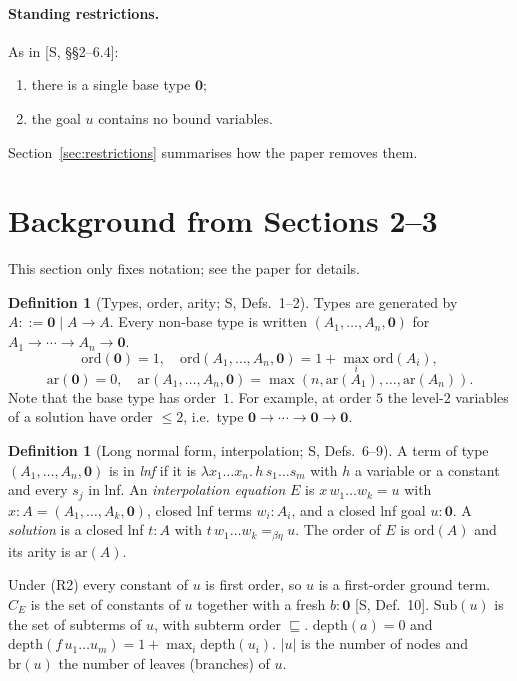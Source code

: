 \documentclass[11pt]{article}
\newcommand{\Ground}{\mathbf{0}}
\newcommand{\ord}{\mathrm{ord}}
\newcommand{\ar}{\mathrm{ar}}
\newcommand{\Sub}{\mathrm{Sub}}
\newcommand{\depth}{\mathrm{depth}}
\newcommand{\br}{\mathrm{br}}
\newcommand{\CE}{C_E}
\newcommand{\sq}{\sqsubseteq}
\theoremstyle{plain}
\theoremstyle{definition}
\newtheorem{definition}[theorem]{Definition}
\theoremstyle{remark}
\begin{document}
\paragraph{Standing restrictions.} As in [S, \S\S2--6.4]:
\begin{enumerate}[(R1)]
\item there is a single base type $\Ground$;
\item the goal $u$ contains no bound variables.
\end{enumerate}
Section~\ref{sec:restrictions} summarises how the paper removes them.

\section{Background from Sections 2--3}\label{sec:background}

This section only fixes notation; see the paper for details.

\begin{definition}[Types, order, arity; S, Defs.~1--2]
Types are generated by $A::=\Ground\mid A\to A$.  Every non-base type
is written $(A_1,\dots,A_n,\Ground)$ for $A_1\to\cdots\to A_n\to\Ground$.
\[
\ord(\Ground)=1,\quad \ord(A_1,\dots,A_n,\Ground)=1+\max_i\ord(A_i),
\]
\[
\ar(\Ground)=0,\quad \ar(A_1,\dots,A_n,\Ground)=\max(n,\ar(A_1),\dots,\ar(A_n)).
\]
Note that the base type has order~$1$.  For example, at order $5$ the
level-$2$ variables of a solution have order $\le2$, i.e.\ type
$\Ground\to\cdots\to\Ground\to\Ground$.
\end{definition}

\begin{definition}[Long normal form, interpolation; S, Defs.~6--9]
A term of type $(A_1,\dots,A_n,\Ground)$ is in \emph{lnf} if it is
$\lambda x_1\dots x_n.\,h\,s_1\dots s_m$ with $h$ a variable or a
constant and every $s_j$ in lnf.  An \emph{interpolation equation} $E$
is $x\,w_1\dots w_k=u$ with $x:A=(A_1,\dots,A_k,\Ground)$, closed lnf
terms $w_i:A_i$, and a closed lnf goal $u:\Ground$.  A \emph{solution} is
a closed lnf $t:A$ with $t\,w_1\dots w_k=_{\beta\eta}u$.  The order of
$E$ is $\ord(A)$ and its arity is $\ar(A)$.
\end{definition}

Under (R2) every constant of $u$ is first order, so $u$ is a first-order
ground term.  $\CE$ is the set of constants of $u$ together with a fresh
$b:\Ground$ [S, Def.~10].  $\Sub(u)$ is the set of subterms of $u$, with
subterm order $\sq$.  $\depth(a)=0$ and
$\depth(f\,u_1\dots u_m)=1+\max_i\depth(u_i)$.  $|u|$ is the number of
nodes and $\br(u)$ the number of leaves (branches) of $u$.
\end{document}
